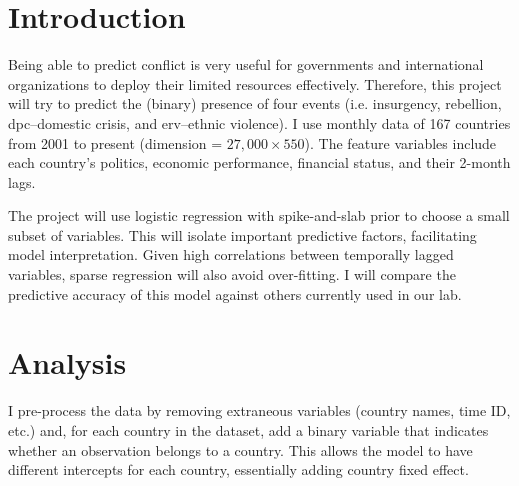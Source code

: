 \documentclass[a0,portrait]{a0poster}
\begin{document}
\begin{multicols}{2} %


\color{Navy} %


\color{SaddleBrown} %

\section*{Introduction}

Being able to predict conflict is very useful for governments and international organizations to deploy their limited resources effectively. Therefore, this project will try to predict the (binary) presence of four events (i.e. insurgency, rebellion, dpc--domestic crisis, and erv--ethnic violence). I use monthly data of 167 countries from 2001 to present (dimension = $27,000 \times 550$). The feature variables include each country's politics, economic performance, financial status, and their 2-month lags.

The project will use logistic regression with spike-and-slab prior to choose a small subset of variables. This will isolate important predictive factors, facilitating model interpretation. Given high correlations between temporally lagged variables, sparse regression will also avoid over-fitting. I will compare the predictive accuracy of this model against others currently used in our lab.

\color{DarkSlateGray} %


\section*{Analysis}

I pre-process the data by removing extraneous variables (country names, time ID, etc.) and, for each country in the dataset, add a binary variable that indicates whether an observation belongs to a country. This allows the model to have different intercepts for each country, essentially adding country fixed effect.


\end{multicols}
\end{document}
